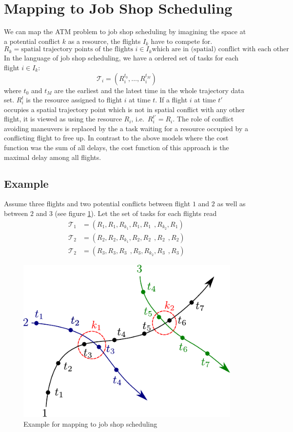 \documentclass{article}
\begin{document}
\section{Mapping to Job Shop Scheduling}
We can map the ATM problem to job shop scheduling by imagining the space at a potential conflict $k$ as a resource, the flights $I_k$ have to compete for.
\begin{equation*}
    R_k = \text{spatial trajectory points of the flights } i \in I_k \text{which are in (spatial) conflict with each other}
\end{equation*}
In the language of job shop scheduling, we have a ordered set of tasks for each flight $i \in I_k$:
\begin{equation*}
    \mathcal{T}_i = \left(R^{t_0}_i, \dots, R^{t_M}_i\right)
\end{equation*}
where $t_0$ and $t_M$ are the earliest and the latest time in the whole trajectory data set.
$R^t_i$ is the resource assigned to flight $i$ at time $t$.
If a flight $i$ at time $t'$ occupies a spatial trajectory point which is not in spatial conflict with any other flight, it is viewed as using the resource $R_i$, i.e.\ $R^{t'}_i = R_i$.
The role of conflict avoiding maneuvers is replaced by the a task waiting for a resource occupied by a conflicting flight to free up.
In contrast to the above models where the cost function was the sum of all delays, the cost function of this approach is the maximal delay among all flights.
\subsection{Example}
Assume three flights and two potential conflicts between flight $1$ and $2$ as well as between $2$ and $3$ (see figure \ref{fig:jobshop_example}).
Let the set of tasks for each flights read
\begin{align*}
    \mathcal{T}_1 &= \left(R_1, R_1, R_{k_1}, R_1, R_1\;\,, R_{k_2}, R_1\right) \\
    \mathcal{T}_2 &= \left(R_2, R_2, R_{k_1}, R_2, R_2\;\,, R_2\;\,, R_2 \right) \\
    \mathcal{T}_2 &= \left(R_3, R_3, R_3\;\,, R_3, R_{k_2}, R_3\;\,, R_3 \right) 
\end{align*}

\begin{figure}[htpb]
    \centering
    \includegraphics[width=0.6\linewidth]{pics/jobshop_example}
    \caption{Example for mapping to job shop scheduling}
    \label{fig:jobshop_example}
\end{figure}
\end{document}
